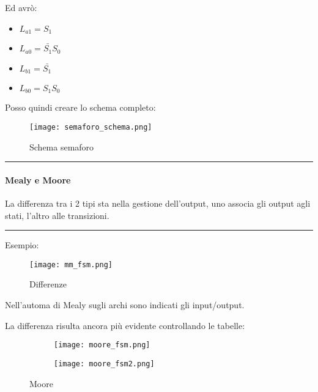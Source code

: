 \documentclass{article}
\begin{document}
Ed avrò:
\begin{itemize}
    \item $L_{a1} = S_1$
    \item $L_{a0} = \bar{S_1}S_0$
    \item $L_{b1} = \bar{S_1}$
    \item $L_{b0} = S_1S_0$
\end{itemize}

\newpage

Posso quindi creare lo schema completo:

\begin{figure}[ht]
    \centering
    \texttt{[image: semaforo\_schema.png]}
    \caption{Schema semaforo}
    \label{fig:semaforo_schema}
\end{figure}

\noindent\rule{\textwidth}{0.5pt}

\vspace{10pt}

\paragraph{Mealy e Moore}

La differenza tra i 2 tipi sta nella gestione dell'output, uno associa gli output agli stati, l'altro alle transizioni.

\noindent\rule{\textwidth}{0.5pt}

Esempio:

\vspace{3pt}

\begin{figure}[ht]
    \centering
    \texttt{[image: mm\_fsm.png]}
    \caption{Differenze}
    \label{fig:fsm_mm}
\end{figure}

Nell'automa di Mealy sugli archi sono indicati gli input/output.

\newpage

La differenza risulta ancora più evidente controllando le tabelle:

    \begin{figure}[ht]
    \begin{minipage}[t]{0.49\textwidth}
        \centering
        \begin{figure}[H]
        \centering
        \texttt{[image: moore\_fsm.png]}
        \end{figure}
        \label{fig:moore1}
    \end{minipage}
    \begin{minipage}[t]{0.49\textwidth}
    \centering
    \begin{figure}[H]
    \centering
    \texttt{[image: moore\_fsm2.png]}
    \end{figure}
    \label{fig:moore2}
    \end{minipage}
    \caption{Moore}
    \end{figure}
\end{document}
